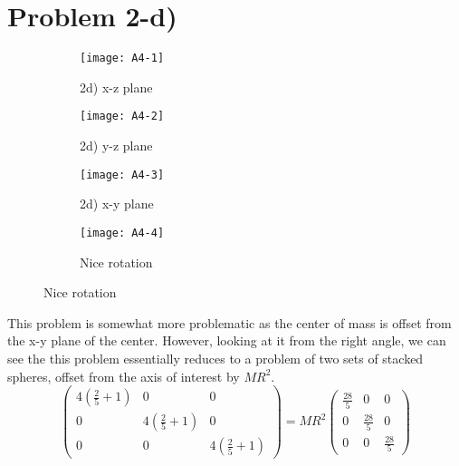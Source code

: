 \section*{Problem 2-d)}
\begin{figure}[h]
\centering
\begin{subfigure}[b]{0.30\textwidth}
\texttt{[image: A4-1]}
\label{fig:A4-1}
\caption{2d) x-z plane}
\end{subfigure}
\begin{subfigure}[b]{0.30\textwidth}
\texttt{[image: A4-2]}
\label{fig:A4-2}
\caption{2d)  y-z plane}
\end{subfigure}
\begin{subfigure}[b]{0.30\textwidth}
\texttt{[image: A4-3]}
\label{fig:A4-3}
\caption{2d) x-y plane}
\end{subfigure}
\begin{subfigure}[b]{0.30\textwidth}
\texttt{[image: A4-4]}
\label{fig:A4-4}
\caption{Nice rotation}
\end{subfigure}
\end{figure}
This problem is somewhat more problematic as the center of mass is offset from the x-y plane of the center. However, looking at it from the right angle, we can see the this problem essentially reduces to a problem of two sets of stacked spheres, offset from the axis of interest by $MR^2$.
\[ \begin{pmatrix} 4(\frac{2}{5}+1)& 0 & 0 \\
0 & 4(\frac{2}{5}+1)& 0 \\
0 & 0 & 4(\frac{2}{5}+1)
\end{pmatrix} =
MR^2 \begin{pmatrix}
\frac{28}{5} & 0 & 0 \\
0 & \frac{28}{5} & 0 \\
0 & 0 & \frac{28}{5}
\end{pmatrix}
\]
